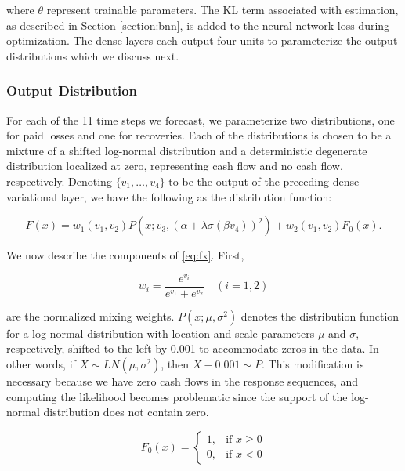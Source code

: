 \documentclass{article}
\begin{document}
where $\theta$ represent trainable parameters. The KL term associated with
estimation, as described in Section \ref{section:bnn}, is added to the neural 
network loss during optimization. The dense layers each output four units to 
parameterize the output distributions which we discuss next.

\subsubsection{Output Distribution}\label{section:outputdist}

For each of the 11 time steps we forecast, we parameterize two distributions, 
one for paid losses and one for recoveries. Each of the distributions is chosen 
to be a mixture of a shifted log-normal distribution and a deterministic 
degenerate distribution localized at zero, representing cash flow and no cash 
flow, respectively. Denoting $\{v_1,\dots,v_4\}$ to be the output of the 
preceding dense variational layer, we have the following as the distribution 
function:

\begin{equation} \label{eq:fx}
    F(x) = w_1(v_1, v_2)P(x; v_3, (\alpha + \lambda\sigma(\beta v_4))^2) + w_2(v_1, v_2)F_0(x).
\end{equation}

We now describe the components of \ref{eq:fx}. First, 

\begin{equation}
    w_i = \frac{e^{v_i}}{e^{v_1} + e^{v_2}}\quad (i = 1, 2)
\end{equation}

are the normalized mixing weights. $P(x; \mu, \sigma^2)$ denotes the 
distribution function for a log-normal distribution with location and scale 
parameters $\mu$ and $\sigma$, respectively, shifted to the left by 0.001 to 
accommodate zeros in the data. In other words, if $X \sim LN(\mu, \sigma^2)$, 
then $X - 0.001 \sim P$. This modification is necessary because we have zero 
cash flows in the response sequences, and computing the likelihood becomes
problematic since the support of the log-normal distribution does not contain
zero.

\begin{equation}
    F_{0}(x)=\left\{\begin{matrix} 1, & \mbox{if }x\ge 0 \\ 0, & \mbox{if }x<0 \end{matrix}\right.
\end{equation}
\end{document}
